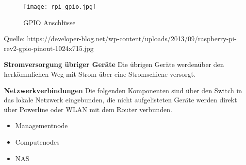 \begin{figure}[htb]
\centering
\texttt{[image: rpi\_gpio.jpg]}
\caption{GPIO Anschlüsse}
\label{fig:GPIO Anschlüsse}
\end{figure} 

Quelle: https://developer-blog.net/wp-content/uploads/2013/09/raspberry-pi-rev2-gpio-pinout-1024x715.jpg

\textbf{Stromversorgung übriger Geräte}\newline
Die übrigen Geräte werdenüber den herkömmlichen Weg mit Strom über eine Stromschiene versorgt.

\textbf{Netzwerkverbindungen}\newline
Die folgenden Komponenten sind über den Switch in das lokale Netzwerk eingebunden, die nicht aufgelisteten Geräte werden direkt über Powerline oder WLAN mit dem Router verbunden.
\begin{itemize}
\item Managementnode
\item Computenodes
\item NAS
\end{itemize}

